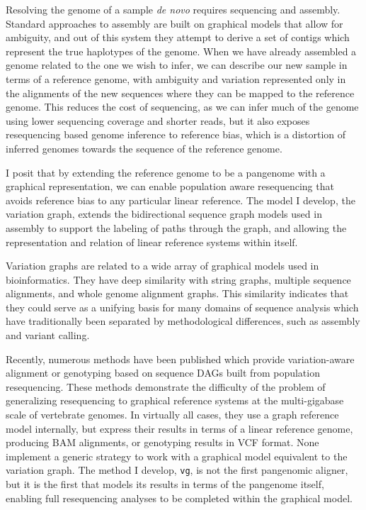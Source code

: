 Resolving the genome of a sample \emph{de novo} requires sequencing and assembly.
Standard approaches to assembly are built on graphical models that allow for ambiguity, and out of this system they attempt to derive a set of contigs which represent the true haplotypes of the genome.
When we have already assembled a genome related to the one we wish to infer, we can describe our new sample in terms of a reference genome, with ambiguity and variation represented only in the alignments of the new sequences where they can be mapped to the reference genome.
This reduces the cost of sequencing, as we can infer much of the genome using lower sequencing coverage and shorter reads, but it also exposes resequencing based genome inference to reference bias, which is a distortion of inferred genomes towards the sequence of the reference genome.

I posit that by extending the reference genome to be a pangenome with a graphical representation, we can enable population aware resequencing that avoids reference bias to any particular linear reference.
The model I develop, the variation graph, extends the bidirectional sequence graph models used in assembly to support the labeling of paths through the graph, and allowing the representation and relation of linear reference systems within itself.

Variation graphs are related to a wide array of graphical models used in bioinformatics.
They have deep similarity with string graphs, multiple sequence alignments, and whole genome alignment graphs.
This similarity indicates that they could serve as a unifying basis for many domains of sequence analysis which have traditionally been separated by methodological differences, such as assembly and variant calling.

Recently, numerous methods have been published which provide variation-aware alignment or genotyping based on sequence DAGs built from population resequencing.
These methods demonstrate the difficulty of the problem of generalizing resequencing to graphical reference systems at the multi-gigabase scale of vertebrate genomes.
In virtually all cases, they use a graph reference model internally, but express their results in terms of a linear reference genome, producing BAM alignments, or genotyping results in VCF format.
None implement a generic strategy to work with a graphical model equivalent to the variation graph.
The method I develop, {\tt vg}, is not the first pangenomic aligner, but it is the first that models its results in terms of the pangenome itself, enabling full resequencing analyses to be completed within the graphical model.

